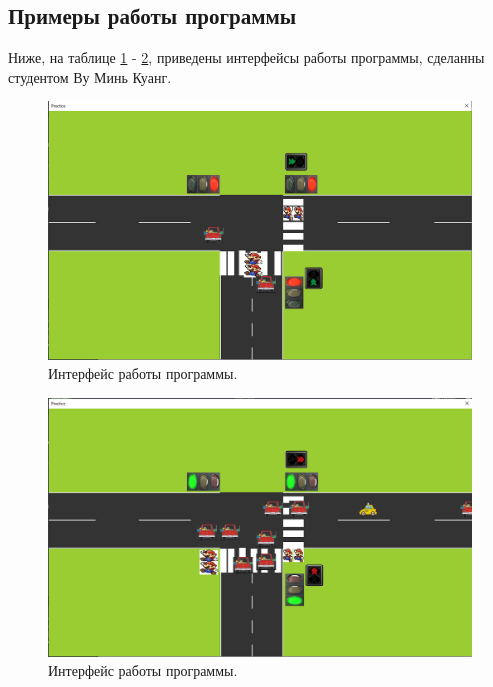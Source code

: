 \subsection{Примеры работы программы}
Ниже, на таблице \ref{img:s14} - \ref{img:s15}, приведены интерфейсы работы программы, сделанны студентом Ву Минь Куанг.
\begin{figure}[H]
	\begin{center}
		\includegraphics[scale=0.45]{img/prac1.png}
	\end{center}
	\captionsetup{justification=centering}
	\caption{Интерфейс работы программы.}
	\label{img:s14}
\end{figure}

\begin{figure}[H]
	\begin{center}
		\includegraphics[scale=0.45]{img/prac2.png}
	\end{center}
	\captionsetup{justification=centering}
	\caption{Интерфейс работы программы.}
	\label{img:s15}
\end{figure}